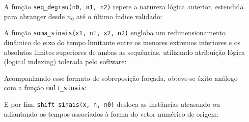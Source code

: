 \documentclass[tcc]{classe_uftex/uftex}
\begin{document}
A função \texttt{seq\_degrau(n0, n1, n2)} repete a natureza lógica anterior, estendida para abranger desde $n_0$ até o último índice validado:


A função \texttt{soma\_sinais(x1, n1, x2, n2)} engloba um redimensionamento dinâmico do eixo do tempo limitante entre os menores extremos inferiores e os absolutos limites superiores de ambas as sequências, utilizando atribuição lógica (logical indexing) tolerada pelo software:


Acompanhando esse formato de sobreposição forçada, obteve-se êxito análogo com a função \texttt{mult\_sinais}:


E por fim, \texttt{shift\_sinais(x, n, n0)} desloca as instâncias atrasando ou adiantando os tempos associados à forma do vetor numérico de origem:

\end{document}
